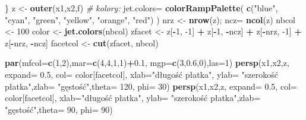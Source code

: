 \documentclass[polish,]{book}
\newenvironment{Shaded}{\begin{snugshade}}{\end{snugshade}}
\newcommand{\CommentTok}[1]{\textcolor[rgb]{0.56,0.35,0.01}{\textit{#1}}}
\newcommand{\DataTypeTok}[1]{\textcolor[rgb]{0.13,0.29,0.53}{#1}}
\newcommand{\DecValTok}[1]{\textcolor[rgb]{0.00,0.00,0.81}{#1}}
\newcommand{\FloatTok}[1]{\textcolor[rgb]{0.00,0.00,0.81}{#1}}
\newcommand{\KeywordTok}[1]{\textcolor[rgb]{0.13,0.29,0.53}{\textbf{#1}}}
\newcommand{\NormalTok}[1]{#1}
\newcommand{\OperatorTok}[1]{\textcolor[rgb]{0.81,0.36,0.00}{\textbf{#1}}}
\newcommand{\StringTok}[1]{\textcolor[rgb]{0.31,0.60,0.02}{#1}}
\begin{document}
\begin{Shaded}
\begin{Highlighting}[]
\NormalTok{  \}}
\NormalTok{z <-}\StringTok{ }\KeywordTok{outer}\NormalTok{(x1,x2,f)}
\CommentTok{# kolory:}
\NormalTok{jet.colors=}\StringTok{ }\KeywordTok{colorRampPalette}\NormalTok{(}
\KeywordTok{c}\NormalTok{(}\StringTok{"blue"}\NormalTok{, }\StringTok{"cyan"}\NormalTok{, }\StringTok{"green"}\NormalTok{, }\StringTok{"yellow"}\NormalTok{, }\StringTok{"orange"}\NormalTok{, }\StringTok{"red"}\NormalTok{) )}
\NormalTok{nrz <-}\StringTok{ }\KeywordTok{nrow}\NormalTok{(z); ncz=}\StringTok{ }\KeywordTok{ncol}\NormalTok{(z)}
\NormalTok{nbcol <-}\StringTok{ }\DecValTok{100}
\NormalTok{color <-}\StringTok{ }\KeywordTok{jet.colors}\NormalTok{(nbcol)}
\NormalTok{zfacet <-}\StringTok{ }\NormalTok{z[}\OperatorTok{-}\DecValTok{1}\NormalTok{, }\DecValTok{-1}\NormalTok{] }\OperatorTok{+}\StringTok{ }\NormalTok{z[}\OperatorTok{-}\DecValTok{1}\NormalTok{, }\OperatorTok{-}\NormalTok{ncz] }\OperatorTok{+}\StringTok{ }\NormalTok{z[}\OperatorTok{-}\NormalTok{nrz, }\DecValTok{-1}\NormalTok{] }\OperatorTok{+}\StringTok{ }\NormalTok{z[}\OperatorTok{-}\NormalTok{nrz, }\OperatorTok{-}\NormalTok{ncz]}
\NormalTok{facetcol <-}\StringTok{ }\KeywordTok{cut}\NormalTok{(zfacet, nbcol)}
\end{Highlighting}
\end{Shaded}

\begin{Shaded}
\begin{Highlighting}[]
\KeywordTok{par}\NormalTok{(}\DataTypeTok{mfcol=}\KeywordTok{c}\NormalTok{(}\DecValTok{1}\NormalTok{,}\DecValTok{2}\NormalTok{),}\DataTypeTok{mar=}\KeywordTok{c}\NormalTok{(}\DecValTok{4}\NormalTok{,}\DecValTok{4}\NormalTok{,}\DecValTok{1}\NormalTok{,}\DecValTok{1}\NormalTok{)}\OperatorTok{+}\FloatTok{0.1}\NormalTok{,}
    \DataTypeTok{mgp=}\KeywordTok{c}\NormalTok{(}\DecValTok{3}\NormalTok{,}\FloatTok{0.6}\NormalTok{,}\DecValTok{0}\NormalTok{),}\DataTypeTok{las=}\DecValTok{1}\NormalTok{)}
\KeywordTok{persp}\NormalTok{(x1,x2,z, }\DataTypeTok{expand=} \FloatTok{0.5}\NormalTok{, }\DataTypeTok{col=}\NormalTok{ color[facetcol], }\DataTypeTok{xlab=}\StringTok{"długość płatka"}\NormalTok{,}
      \DataTypeTok{ylab=} \StringTok{"szerokość płatka"}\NormalTok{,}\DataTypeTok{zlab=} \StringTok{"gęstość"}\NormalTok{,}\DataTypeTok{theta=} \DecValTok{120}\NormalTok{, }\DataTypeTok{phi=} \DecValTok{30}\NormalTok{)}
\KeywordTok{persp}\NormalTok{(x1,x2,z, }\DataTypeTok{expand=} \FloatTok{0.5}\NormalTok{, }\DataTypeTok{col=}\NormalTok{ color[facetcol], }\DataTypeTok{xlab=}\StringTok{"długość płatka"}\NormalTok{,}
      \DataTypeTok{ylab=} \StringTok{"szerokość płatka"}\NormalTok{,}\DataTypeTok{zlab=} \StringTok{"gęstość"}\NormalTok{,}\DataTypeTok{theta=} \DecValTok{90}\NormalTok{, }\DataTypeTok{phi=} \DecValTok{90}\NormalTok{)}
\end{Highlighting}
\end{Shaded}
\end{document}
